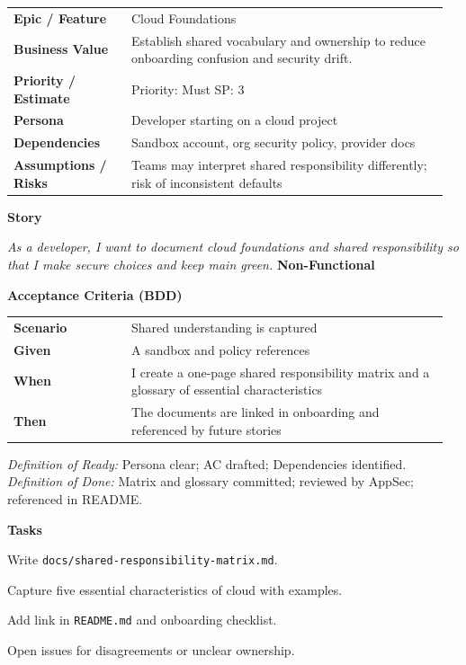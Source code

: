\documentclass[11pt,letterpaper]{article}
\makeatletter
\newenvironment{kvtable}{%
  \begin{tabular}{@{}>{\bfseries\arraybackslash}p{0.26\linewidth} p{0.70\linewidth}@{}}
}{\end{tabular}}
\newenvironment{bdd}{%
  \begin{tabular}{@{}>{\bfseries\arraybackslash}p{0.26\linewidth} p{0.70\linewidth}@{}}
}{\end{tabular}}
\newcommand{\DoRDoD}[2]{%
  \vspace{0.35em}
  {\footnotesize\color{Muted}%
    \textit{Definition of Ready:} #1 \; \textbullet\;
    \textit{Definition of Done:} #2%
  }%
}
\newenvironment{storycard}[2]{%
  \begin{tcolorbox}[cloudcard, title={#1 --- #2}]%
}{\end{tcolorbox}}
\newcommand{\sectionlabel}[1]{\vspace{0.35em}\textbf{#1}\par}
\makeatother
\begin{document}
\begin{storycard}{CCS-1}{Ch. 1 — Foundations \& Essentials}
\begin{kvtable}
Epic / Feature & Cloud Foundations\\
Business Value & Establish shared vocabulary and ownership to reduce onboarding confusion and security drift.\\
Priority / Estimate & Priority: Must \quad SP: 3\\
Persona & Developer starting on a cloud project\\
Dependencies & Sandbox account, org security policy, provider docs\\
Assumptions / Risks & Teams may interpret shared responsibility differently; risk of inconsistent defaults\\
\end{kvtable}
\sectionlabel{Story}
\textit{As a developer, I want to document cloud foundations and shared responsibility so that I make secure choices and keep main green.}
\sectionlabel{Non-Functional}\;\;
\sectionlabel{Acceptance Criteria (BDD)}
\begin{bdd}
Scenario & Shared understanding is captured\\
Given & A sandbox and policy references\\
When & I create a one-page shared responsibility matrix and a glossary of essential characteristics\\
Then & The documents are linked in onboarding and referenced by future stories\\
\end{bdd}
\DoRDoD{Persona clear; AC drafted; Dependencies identified.}{Matrix and glossary committed; reviewed by AppSec; referenced in README.}
\sectionlabel{Tasks}
\begin{checklist}
\item Write \texttt{docs/shared-responsibility-matrix.md}.
\item Capture five essential characteristics of cloud with examples.
\item Add link in \texttt{README.md} and onboarding checklist.
\item Open issues for disagreements or unclear ownership.
\end{checklist}
\end{storycard}
\end{document}
